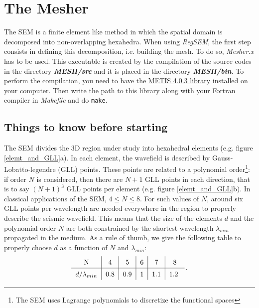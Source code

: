 \section{The Mesher}
\label{mesh}


The SEM is a finite element like method in which the spatial domain is decomposed into non-overlapping hexahedra. When using \textit{RegSEM}, the first step consists in defining this decomposition, i.e. building the mesh. To do so, \textit{Mesher.x} has to be used. This executable is created by the compilation of the source codes in the directory \textit{\bfseries MESH/src} and it is placed in the directory \textit{\bfseries MESH/bin}. To perform the compilation, you need to have the \href{http://glaros.dtc.umn.edu/gkhome/metis/metis/overview}{METIS 4.0.3 library} installed on your computer. Then write the path to this library along with your Fortran compiler in \textit{Makefile} and do \texttt{make}.


\subsection{Things to know before starting}

The SEM divides the 3D region under study into hexahedral elements (e.g. figure \ref{elemt_and_GLL}a). In each element, the wavefield is described by Gauss-Lobatto-legendre (GLL) points. These points are related to a polynomial order\footnote{The SEM uses Lagrange polynomials to discretize the functional spaces}: if order $N$ is considered, then there are $N+1$ GLL points in each direction, that is to say $(N+1)^3$ GLL points per element (e.g. figure \ref{elemt_and_GLL}b). In classical applications of the SEM, $4 \le N \le 8$. For such values of $N$, around six GLL points per wavelength are needed everywhere in the region to properly describe the seismic wavefield. This means that the size of the elements $d$ and the polynomial order $N$ are both constrained by the shortest wavelength $\lambda_{min}$ propagated in the medium. As a rule of thumb, we give the following table to properly choose $d$ as a function of $N$ and $\lambda_{min}$:
\begin{equation}
\renewcommand{\arraystretch}{1.4} %
\begin{tabular}{c|c|c|c|c|c}
N & 4 & 5 & 6 & 7 & 8 \\ \hline
$d/\lambda_{min}$ & 0.8 & 0.9 & 1 & 1.1 & 1.2
\label{elemsize}
\end{tabular}\,.
\end{equation}

